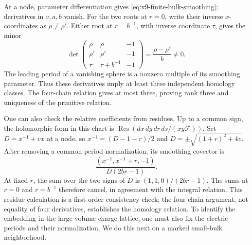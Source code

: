 At a node, parameter differentiation gives
\eqref{eq:x9-finite-bulk-smoothing}; derivatives in $v,a,b$ vanish.
For the two roots at $r=0$, write their inverse $x$-coordinates
as $\rho\neq\rho'$. Either root at $r=b^{-1}$, with inverse
coordinate $\tau$, gives the minor
\begin{equation}
 \det\begin{pmatrix}
 \rho&\rho&-1\\ \rho'&\rho'&-1\\
 \tau&\tau+b^{-1}&-1
 \end{pmatrix}=\frac{\rho-\rho'}{b}\neq0.
 \label{eq:x9-bulk-rank-three}
\end{equation}
The leading period of a vanishing sphere is a nonzero multiple
of its smoothing parameter. Thus these derivatives imply at least
three independent homology classes. The four-chain relation gives
at most three, proving rank three and uniqueness of the primitive
relation.

One can also check the relative coefficients from residues.
Up to a common sign, the holomorphic form in this chart is
$\operatorname{Res}(dx\,dy\,dr\,ds/(xy\mathcal F))$.
Set $D=x^{-1}+vx$ at a node, so
$x^{-1}=(D-1-r)/2$ and $D=\pm\sqrt{(1+r)^2+4v}$.
After removing a common period normalization, its smoothing
covector is
\begin{equation}
 \frac{(x^{-1},x^{-1}+r,-1)}{D(2br-1)}.
 \label{eq:x9-bulk-residue-covectors}
\end{equation}
At fixed $r$, the sum over the two signs of $D$ is
$(1,1,0)/(2br-1)$. The sums at $r=0$ and $r=b^{-1}$ therefore
cancel, in agreement with the integral relation. This residue
calculation is a first-order consistency check; the four-chain
argument, not equality of four derivatives, establishes the
homology relation. To identify the embedding in the large-volume
charge lattice, one must also fix the electric periods and their
normalization. We do this next on a marked small-bulk neighborhood.

